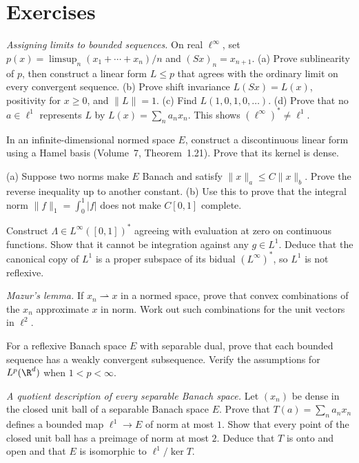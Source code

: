 \section{Exercises}

\begin{exercise}[$\star\star$]\label{ex:banachlimit}
\emph{Assigning limits to bounded sequences.} On real $\ell^\infty$, set $p(x)=\limsup_n(x_1+\cdots+x_n)/n$ and $(Sx)_n=x_{n+1}$. (a) Prove sublinearity of $p$, then construct a linear form $L\le p$ that agrees with the ordinary limit on every convergent sequence. (b) Prove shift invariance $L(Sx)=L(x)$, positivity for $x\ge0$, and $\|L\|=1$. (c) Find $L(1,0,1,0,\dots)$. (d) Prove that no $a\in\ell^1$ represents $L$ by $L(x)=\sum_na_nx_n$. This shows $(\ell^\infty)^*\ne\ell^1$.
\end{exercise}
\begin{exercise}[$\star$]\label{ex:discontinuous}
In an infinite-dimensional normed space $E$, construct a discontinuous linear form using a Hamel basis (Volume~7, Theorem~1.21). Prove that its kernel is dense.
\end{exercise}
\begin{exercise}[$\star$]\label{ex:twonorms}
(a) Suppose two norms make $E$ Banach and satisfy $\|x\|_a\le C\|x\|_b$. Prove the reverse inequality up to another constant. (b) Use this to prove that the integral norm $\|f\|_1=\int_0^1|f|$ does not make $C[0,1]$ complete.
\end{exercise}
\begin{exercise}[$\star\star$]\label{ex:linftydual}
Construct $\Lambda\in L^\infty([0,1])^*$ agreeing with evaluation at zero on continuous functions. Show that it cannot be integration against any $g\in L^1$. Deduce that the canonical copy of $L^1$ is a proper subspace of its bidual $(L^\infty)^*$, so $L^1$ is not reflexive.
\end{exercise}
\begin{exercise}[$\star\star$]\label{ex:mazur}
\emph{Mazur's lemma.} If $x_n\rightharpoonup x$ in a normed space, prove that convex combinations of the $x_n$ approximate $x$ in norm. Work out such combinations for the unit vectors in $\ell^2$.
\end{exercise}
\begin{exercise}[$\star\star$]\label{ex:reflexiveweak}
For a reflexive Banach space $E$ with separable dual, prove that each bounded sequence has a weakly convergent subsequence. Verify the assumptions for $L^p(\R^d)$ when $1<p<\infty$.
\end{exercise}
\begin{exercise}[$\star\star\star$]\label{ex:l1quotient}
\emph{A quotient description of every separable Banach space.} Let $(x_n)$ be dense in the closed unit ball of a separable Banach space $E$. Prove that $T(a)=\sum_na_nx_n$ defines a bounded map $\ell^1\to E$ of norm at most $1$. Show that every point of the closed unit ball has a preimage of norm at most $2$. Deduce that $T$ is onto and open and that $E$ is isomorphic to $\ell^1/\ker T$.
\end{exercise}

